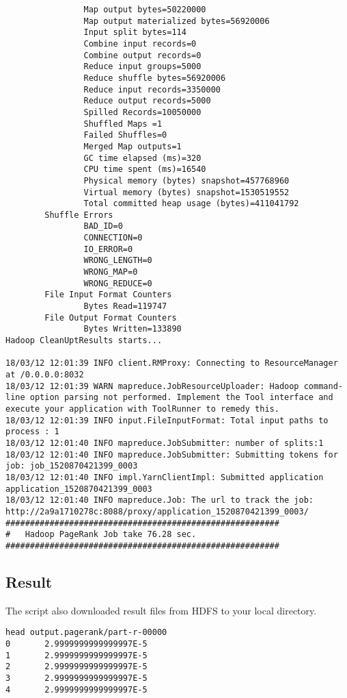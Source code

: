 \begin{lstlisting}
                Map output bytes=50220000
                Map output materialized bytes=56920006
                Input split bytes=114
                Combine input records=0
                Combine output records=0
                Reduce input groups=5000
                Reduce shuffle bytes=56920006
                Reduce input records=3350000
                Reduce output records=5000
                Spilled Records=10050000
                Shuffled Maps =1
                Failed Shuffles=0
                Merged Map outputs=1
                GC time elapsed (ms)=320
                CPU time spent (ms)=16540
                Physical memory (bytes) snapshot=457768960
                Virtual memory (bytes) snapshot=1530519552
                Total committed heap usage (bytes)=411041792
        Shuffle Errors
                BAD_ID=0
                CONNECTION=0
                IO_ERROR=0
                WRONG_LENGTH=0
                WRONG_MAP=0
                WRONG_REDUCE=0
        File Input Format Counters
                Bytes Read=119747
        File Output Format Counters
                Bytes Written=133890
Hadoop CleanUptResults starts...

18/03/12 12:01:39 INFO client.RMProxy: Connecting to ResourceManager at /0.0.0.0:8032
18/03/12 12:01:39 WARN mapreduce.JobResourceUploader: Hadoop command-line option parsing not performed. Implement the Tool interface and execute your application with ToolRunner to remedy this.
18/03/12 12:01:39 INFO input.FileInputFormat: Total input paths to process : 1
18/03/12 12:01:40 INFO mapreduce.JobSubmitter: number of splits:1
18/03/12 12:01:40 INFO mapreduce.JobSubmitter: Submitting tokens for job: job_1520870421399_0003
18/03/12 12:01:40 INFO impl.YarnClientImpl: Submitted application application_1520870421399_0003
18/03/12 12:01:40 INFO mapreduce.Job: The url to track the job: http://2a9a1710278c:8088/proxy/application_1520870421399_0003/
########################################################
#   Hadoop PageRank Job take 76.28 sec.
########################################################
\end{lstlisting}

\subsection{Result}

The script also downloaded result files from HDFS to your local
directory.

\begin{lstlisting}
head output.pagerank/part-r-00000
0       2.9999999999999997E-5
1       2.9999999999999997E-5
2       2.9999999999999997E-5
3       2.9999999999999997E-5
4       2.9999999999999997E-5
\end{lstlisting}

